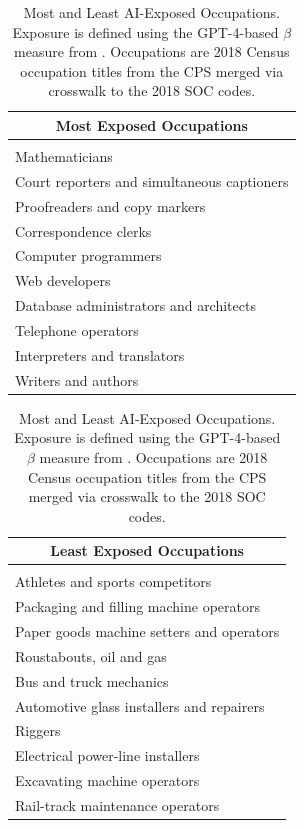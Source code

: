 \documentclass[12pt]{article}
\numberwithin{equation}{section}
\theoremstyle{theorem}\newcustomtheorem{theorem}{{\bf\sc Theorem}}
\theoremstyle{definition}\newcustomtheorem{assumption}{{\bf\sc Assumption}}
\theoremstyle{theorem} \newcustomtheorem{proposition}{{\bf\sc Proposition}}
\begin{document}
\begin{table}[htbp]
	\centering
	\caption{Most and Least AI-Exposed Occupations. Exposure is defined using the GPT-4-based $\beta$ measure from \citet{eloundou_gpts_2024}. Occupations are 2018 Census occupation titles from the CPS merged via crosswalk to the 2018 SOC codes.}
	\begin{minipage}{0.48\textwidth}
		\centering
		\begin{tabular}{l}
			\hline
			\multicolumn{1}{c}{\textbf{Most Exposed Occupations}} \\
			\hline
			\\[-0.8em]
			Mathematicians \\[0.5em]
			Court reporters and simultaneous captioners \\[0.5em]
			Proofreaders and copy markers \\[0.5em]
			Correspondence clerks \\[0.5em]
			Computer programmers \\[0.5em]
			Web developers \\[0.5em]
			Database administrators and architects \\[0.5em]
			Telephone operators \\[0.5em]
			Interpreters and translators \\[0.5em]
			Writers and authors \\[0.5em]
			\hline
		\end{tabular}
	\end{minipage}
	\hfill
	\begin{minipage}{0.48\textwidth}
		\centering
		\begin{tabular}{l}
			\hline
			\multicolumn{1}{c}{\textbf{Least Exposed Occupations}} \\
			\hline
			\\[-0.8em]
			Athletes and sports competitors \\[0.5em]
			Packaging and filling machine operators \\[0.5em]
			Paper goods machine setters and operators \\[0.5em]
			Roustabouts, oil and gas \\[0.5em]
			Bus and truck mechanics \\[0.5em]
			Automotive glass installers and repairers \\[0.5em]
			Riggers \\[0.5em]
			Electrical power-line installers \\[0.5em]
			Excavating machine operators \\[0.5em]
			Rail-track maintenance operators \\[0.5em]
			\hline
		\end{tabular}
	\end{minipage}
	\label{tab:ai_exposure}
\end{table}
\end{document}
